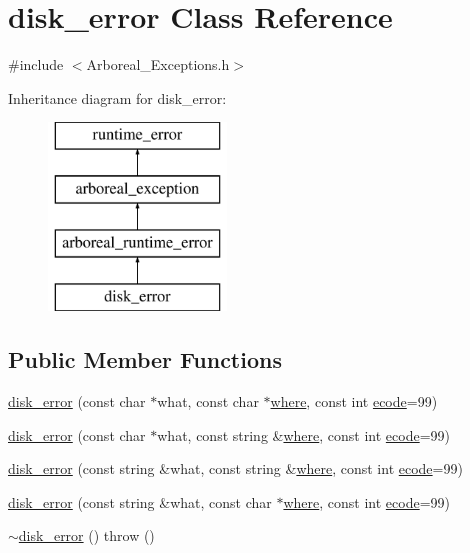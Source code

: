 \hypertarget{classdisk__error}{}\section{disk\+\_\+error Class Reference}
\label{classdisk__error}


{\ttfamily \#include $<$Arboreal\+\_\+\+Exceptions.\+h$>$}

Inheritance diagram for disk\+\_\+error\+:\begin{figure}[H]
\begin{center}
\leavevmode
\includegraphics[height=5.000000cm]{classdisk__error}
\end{center}
\end{figure}
\subsection*{Public Member Functions}
\begin{DoxyCompactItemize}
\item 
\mbox{\hyperlink{classdisk__error_a2b3f22e37f13642df676c5eaf10526d3}{disk\+\_\+error}} (const char $\ast$what, const char $\ast$\mbox{\hyperlink{classarboreal__exception_a802003dee586aaeb0b0d7ce909da2dad}{where}}, const int \mbox{\hyperlink{classarboreal__exception_a318e716601c544d92ff9af25edebd725}{ecode}}=99)
\item 
\mbox{\hyperlink{classdisk__error_a0c883fc590a36b64bfb88b403637a89f}{disk\+\_\+error}} (const char $\ast$what, const string \&\mbox{\hyperlink{classarboreal__exception_a802003dee586aaeb0b0d7ce909da2dad}{where}}, const int \mbox{\hyperlink{classarboreal__exception_a318e716601c544d92ff9af25edebd725}{ecode}}=99)
\item 
\mbox{\hyperlink{classdisk__error_af7db4123b6989178ad42e577a94b053e}{disk\+\_\+error}} (const string \&what, const string \&\mbox{\hyperlink{classarboreal__exception_a802003dee586aaeb0b0d7ce909da2dad}{where}}, const int \mbox{\hyperlink{classarboreal__exception_a318e716601c544d92ff9af25edebd725}{ecode}}=99)
\item 
\mbox{\hyperlink{classdisk__error_a0288a245365c28dc6c48e5fd0c8fafd7}{disk\+\_\+error}} (const string \&what, const char $\ast$\mbox{\hyperlink{classarboreal__exception_a802003dee586aaeb0b0d7ce909da2dad}{where}}, const int \mbox{\hyperlink{classarboreal__exception_a318e716601c544d92ff9af25edebd725}{ecode}}=99)
\item 
\mbox{\hyperlink{classdisk__error_a399727e0ce763f46ca1a8abcd4433654}{$\sim$disk\+\_\+error}} ()  throw ()
\end{DoxyCompactItemize}
